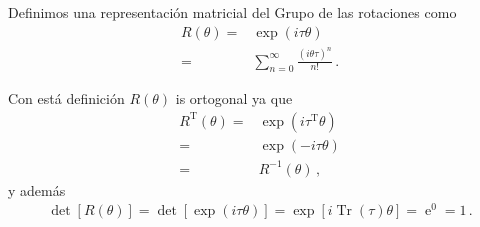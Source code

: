 \begin{frame}

  

Definimos una representación matricial del Grupo de las rotaciones como
\begin{align}
  \label{eq:tye}
  R(\theta)=&\exp \left(i \tau \theta  \right) \nonumber\\
=&\sum_{n=0}^{\infty}\frac{\left(i \theta\tau \right)^{n}}{n!}\,.
\end{align}

Con está definición $R(\theta)$ is ortogonal ya que
\begin{align}
  R^{\operatorname{T}}(\theta)=& \exp \left(i \tau^{\operatorname{T}} \theta  \right) \nonumber\\
        =& \exp \left(-i \tau \theta  \right) \nonumber\\
        =&R^{-1}(\theta)\,,
\end{align}
y además
\begin{align}
  \operatorname{det}[R(\theta)]=\operatorname{det} \left[ \exp \left(i \tau \theta  \right)  \right]
  =\exp \left[ i \operatorname{Tr}(\tau) \theta\right]=\operatorname{e}^0=1\,.
\end{align}




\end{frame}
